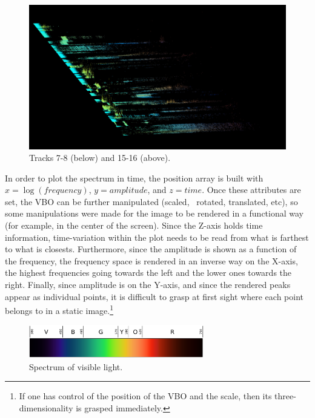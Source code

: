 \documentclass{article}
\begin{document}
\begin{figure}
\begin{multicols}{2}
    \includegraphics[width=\linewidth]{preset-50-8.jpg}%
\end{multicols}
\caption{Tracks 7-8 (below) and 15-16 (above).}
\end{figure}


In order to plot the spectrum in time, the position array is built with  $x=\log (\mathit{frequency})$,  $y=\mathit{amplitude}$, and  $z=\mathit{time}$. Once these attributes are set, the VBO can be further manipulated (scaled, \ rotated, translated, etc), so some manipulations were made for the image to be rendered in a functional way (for example, in the center of the screen). Since the Z-axis holds time information, time-variation within the plot needs to be read from what is farthest to what is closests. Furthermore, since the amplitude is shown as a function of the frequency, the frequency space is rendered in an inverse way on the X-axis, the highest frequencies going towards the left and the lower ones towards the right. Finally, since amplitude is on the Y-axis, and since the rendered peaks appear as individual points, it is difficult to grasp at first sight where each point belongs to in a static image.\footnote{If one has control of the position of the VBO and the scale, then its three-dimensionality is grasped immediately.} 



\begin{center}
\begin{figure}
\includegraphics[width=3in]{foryoungears-img002.png}
\caption{Spectrum of visible light.}
\end{figure}
\end{center}
\end{document}
